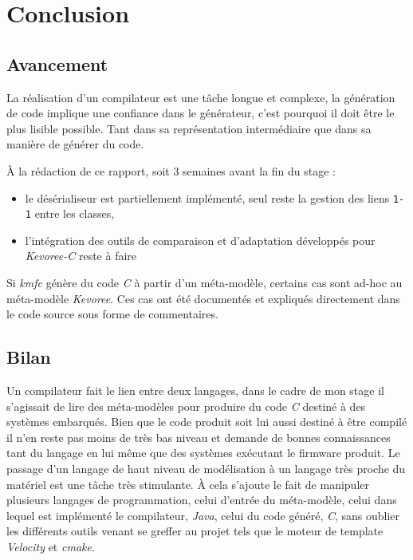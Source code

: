 \section*{Conclusion}
{}

\subsection*{Avancement}
{}
La réalisation d'un compilateur est une tâche longue et complexe, la génération de code implique une confiance dans le générateur, c'est pourquoi il doit être le plus lisible possible. Tant dans sa représentation intermédiaire que dans sa manière de générer du code.

À la rédaction de ce rapport, soit 3 semaines avant la fin du stage :
\begin{itemize}
\item le désérialiseur est partiellement implémenté, seul reste la gestion des liens \texttt{1-1} entre les classes,
\item l'intégration des outils de comparaison et d'adaptation développés pour \emph{Kevoree-C} reste à faire
\end{itemize}

Si \emph{kmfc} génère du code \emph{C} à partir d'un méta-modèle, certains cas sont ad-hoc au méta-modèle \emph{Kevoree}. Ces cas ont été documentés et expliqués directement dans le code source sous forme de commentaires.

\subsection*{Bilan}
{}

Un compilateur fait le lien entre deux langages, dans le cadre de mon stage il s'agissait de lire des méta-modèles pour produire du code \emph{C} destiné à des systèmes embarqués. Bien que le code produit soit lui aussi destiné à être compilé il n'en reste pas moins de très bas niveau et demande de bonnes connaissances tant du langage en lui même que des systèmes exécutant le firmware produit.
Le passage d'un langage de haut niveau de modélisation à un langage très proche du matériel est une tâche très stimulante. À cela s'ajoute le fait de manipuler plusieurs langages de programmation, celui d'entrée du méta-modèle, celui dans lequel est implémenté le compilateur, \emph{Java}, celui du code généré, \emph{C}, sans oublier les différents outils venant se greffer au projet tels que le moteur de template \emph{Velocity} et \emph{cmake}.


